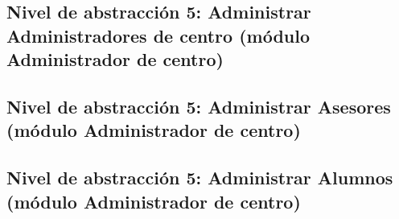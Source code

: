 \subsection{Nivel de abstracción 5: Administrar Administradores de centro (\-mó\-dulo Administrador de centro)}



\subsection{Nivel de abstracción 5: Administrar Asesores (módulo Administrador de centro)}



\subsection{Nivel de abstracción 5: Administrar Alumnos (módulo Administrador de centro)}


